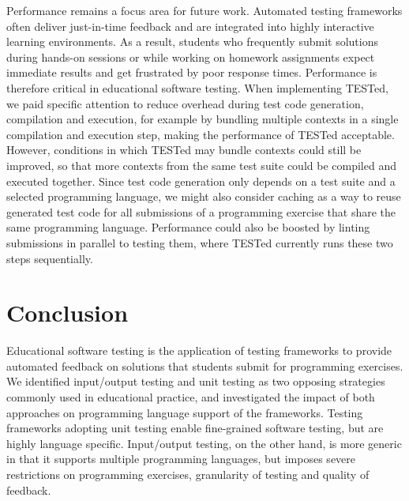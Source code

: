 \documentclass[../main]{subfiles}
\begin{document}
Performance remains a focus area for future work.
Automated testing frameworks often deliver just-in-time feedback and are integrated into highly interactive learning environments.
As a result, students who frequently submit solutions during hands-on sessions or while working on homework assignments expect immediate results and get frustrated by poor response times.
Performance is therefore critical in educational software testing.
When implementing TESTed, we paid specific attention to reduce overhead during test code generation, compilation and execution, for example by bundling multiple contexts in a single compilation and execution step, making the performance of TESTed acceptable.
However, conditions in which TESTed may bundle contexts could still be improved, so that more contexts from the same test suite could be compiled and executed together.
Since test code generation only depends on a test suite and a selected programming language, we might also consider caching as a way to reuse generated test code for all submissions of a programming exercise that share the same programming language.
Performance could also be boosted by linting submissions in parallel to testing them, where TESTed currently runs these two steps sequentially.

\section{Conclusion}\label{sec:tested1-conclusion}

Educational software testing is the application of testing frameworks to provide automated feedback on solutions that students submit for programming exercises.
We identified input/output testing and unit testing as two opposing strategies commonly used in educational practice, and investigated the impact of both approaches on programming language support of the frameworks.
Testing frameworks adopting unit testing enable fine-grained software testing, but are highly language specific.
Input/output testing, on the other hand, is more generic in that it supports multiple programming languages, but imposes severe restrictions on programming exercises, granularity of testing and quality of feedback.
\end{document}

